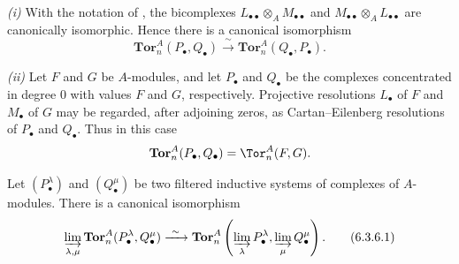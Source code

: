\begin{remarks}[6.3.5]
\label{III.6.3.5}
\emph{(i)} With the notation of , the bicomplexes
$L_{\bullet\bullet}\otimes_AM_{\bullet\bullet}$ and
$M_{\bullet\bullet}\otimes_AL_{\bullet\bullet}$ are canonically
isomorphic.  Hence there is a canonical isomorphism
\[
  \mathbf{Tor}_n^A(P_\bullet,Q_\bullet)
  \xrightarrow{\ \sim\ }
  \mathbf{Tor}_n^A(Q_\bullet,P_\bullet).
\]

\emph{(ii)} Let $F$ and $G$ be $A$-modules, and let $P_\bullet$
and $Q_\bullet$ be the complexes concentrated in degree $0$ with
values $F$ and $G$, respectively.  Projective resolutions
$L_\bullet$ of $F$ and $M_\bullet$ of $G$ may be regarded, after
adjoining zeros, as Cartan--Eilenberg resolutions of $P_\bullet$
and $Q_\bullet$.  Thus in this case
\[
  \mathbf{Tor}_n^A(P_\bullet,Q_\bullet)=\Tor_n^A(F,G).
\]
\end{remarks}

\begin{proposition}[6.3.6]
\label{III.6.3.6}
Let $(P_\bullet^\lambda)$ and $(Q_\bullet^\mu)$ be two filtered
inductive systems of complexes of $A$-modules.  There is a
canonical isomorphism
\[
  \varinjlim_{\lambda,\mu}
  \mathbf{Tor}_n^A(P_\bullet^\lambda,Q_\bullet^\mu)
  \xrightarrow{\ \sim\ }
  \mathbf{Tor}_n^A\left(
    \varinjlim_\lambda P_\bullet^\lambda,
    \varinjlim_\mu Q_\bullet^\mu
  \right).
  \tag{6.3.6.1}\label{III.6.3.6.1}
\]
\end{proposition}

